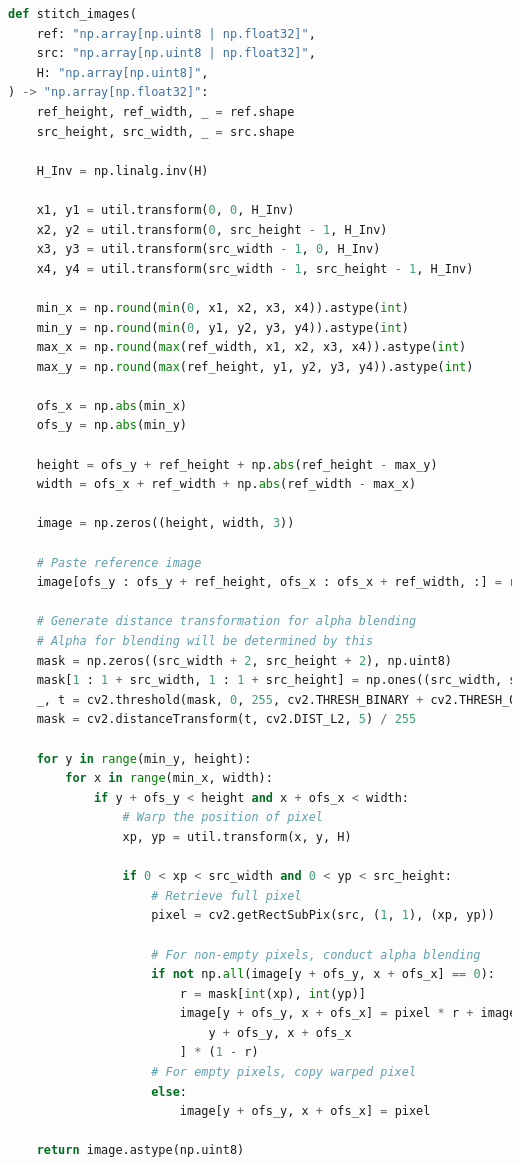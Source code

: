 \documentclass{report}
\begin{document}
\begin{lstlisting}[language=Python, caption=stitch\_images, firstnumber=56]
def stitch_images(
    ref: "np.array[np.uint8 | np.float32]",
    src: "np.array[np.uint8 | np.float32]",
    H: "np.array[np.uint8]",
) -> "np.array[np.float32]":
    ref_height, ref_width, _ = ref.shape
    src_height, src_width, _ = src.shape

    H_Inv = np.linalg.inv(H)

    x1, y1 = util.transform(0, 0, H_Inv)
    x2, y2 = util.transform(0, src_height - 1, H_Inv)
    x3, y3 = util.transform(src_width - 1, 0, H_Inv)
    x4, y4 = util.transform(src_width - 1, src_height - 1, H_Inv)

    min_x = np.round(min(0, x1, x2, x3, x4)).astype(int)
    min_y = np.round(min(0, y1, y2, y3, y4)).astype(int)
    max_x = np.round(max(ref_width, x1, x2, x3, x4)).astype(int)
    max_y = np.round(max(ref_height, y1, y2, y3, y4)).astype(int)

    ofs_x = np.abs(min_x)
    ofs_y = np.abs(min_y)

    height = ofs_y + ref_height + np.abs(ref_height - max_y)
    width = ofs_x + ref_width + np.abs(ref_width - max_x)

    image = np.zeros((height, width, 3))

    # Paste reference image
    image[ofs_y : ofs_y + ref_height, ofs_x : ofs_x + ref_width, :] = ref

    # Generate distance transformation for alpha blending
    # Alpha for blending will be determined by this
    mask = np.zeros((src_width + 2, src_height + 2), np.uint8)
    mask[1 : 1 + src_width, 1 : 1 + src_height] = np.ones((src_width, src_height)) * 255
    _, t = cv2.threshold(mask, 0, 255, cv2.THRESH_BINARY + cv2.THRESH_OTSU)
    mask = cv2.distanceTransform(t, cv2.DIST_L2, 5) / 255

    for y in range(min_y, height):
        for x in range(min_x, width):
            if y + ofs_y < height and x + ofs_x < width:
                # Warp the position of pixel
                xp, yp = util.transform(x, y, H)

                if 0 < xp < src_width and 0 < yp < src_height:
                    # Retrieve full pixel
                    pixel = cv2.getRectSubPix(src, (1, 1), (xp, yp))

                    # For non-empty pixels, conduct alpha blending
                    if not np.all(image[y + ofs_y, x + ofs_x] == 0):
                        r = mask[int(xp), int(yp)]
                        image[y + ofs_y, x + ofs_x] = pixel * r + image[
                            y + ofs_y, x + ofs_x
                        ] * (1 - r)
                    # For empty pixels, copy warped pixel
                    else:
                        image[y + ofs_y, x + ofs_x] = pixel

    return image.astype(np.uint8)
\end{lstlisting}
\end{document}
